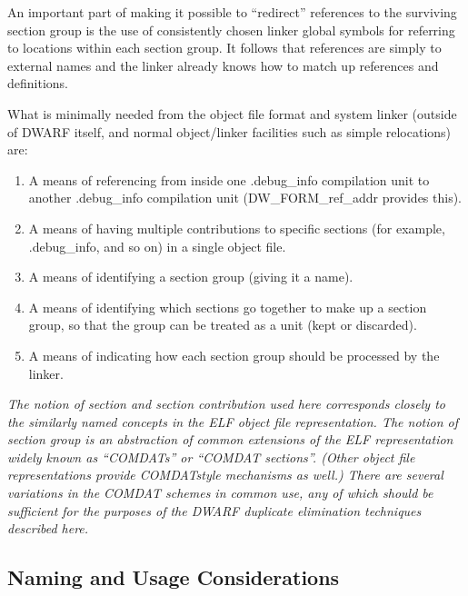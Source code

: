 An important part of making it possible to “redirect”
references to the surviving section group is the use of
consistently chosen linker global symbols for referring to
locations within each section group. It follows that references
are simply to external names and the linker already knows
how to match up references and definitions.

What is minimally needed from the object file format and system
linker (outside of DWARF itself, and normal object/linker
facilities such as simple relocations) are:

\begin{enumerate}[1.]

\item A means of referencing from inside one .debug\_info
compilation unit to another .debug\_info compilation unit
(DW\-\_FORM\-\_ref\-\_addr provides this).

\item A means of having multiple contributions to specific sections
(for example, .debug\_info, and so on) in a single object file.

\item  A means of identifying a section group (giving it a name).

\item A means of identifying which sections go together to make
up a section group, so that the group can be treated as a unit
(kept or discarded).

\item  A means of indicating how each section group should be
processed by the linker.

\end{enumerate}

\textit{The notion of section and section contribution used here
corresponds closely to the similarly named concepts in the
ELF object file representation. The notion of section group is
an abstraction of common extensions of the ELF representation
widely known as ``COMDATs'' or ``COMDAT sections''. (Other
object file representations provide COMDAT\dash style mechanisms as
well.) There are several variations in the COMDAT schemes in
common use, any of which should be sufficient for the purposes
of the DWARF duplicate elimination techniques described here.}

\subsection{Naming and Usage Considerations}
\label{app:namingandusageconsiderations}

